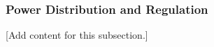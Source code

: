 
\subsubsection{Power Distribution and Regulation}
\label{subsubsec:design_2_2_2_power_distribution_regulation}

[Add content for this subsection.]

